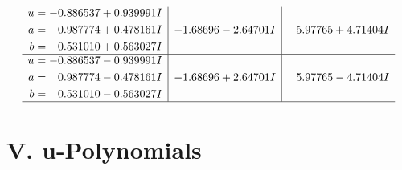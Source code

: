 \documentclass[1p]{elsarticle_modified}
\theoremstyle{definition}
\begin{document}
$$\begin{array}{c|c|c}
\begin{aligned}
u &= -0.886537 + 0.939991 I \\
a &= \phantom{-}0.987774 + 0.478161 I \\
b &= \phantom{-}0.531010 + 0.563027 I\end{aligned}
 & -1.68696 - 2.64701 I & \phantom{-}5.97765 + 4.71404 I \\ \hline\begin{aligned}
u &= -0.886537 - 0.939991 I \\
a &= \phantom{-}0.987774 - 0.478161 I \\
b &= \phantom{-}0.531010 - 0.563027 I\end{aligned}
 & -1.68696 + 2.64701 I & \phantom{-}5.97765 - 4.71404 I\\
 \hline 
 \end{array}$$\newpage
\newpage\renewcommand{\arraystretch}{1}
\centering \section*{ V. u-Polynomials}
\end{document}
